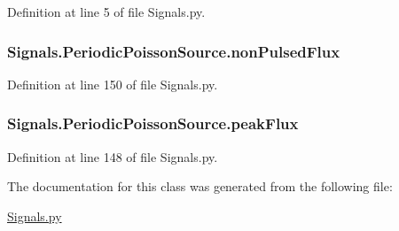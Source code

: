 Definition at line 5 of file Signals.\+py.

\subsubsection[{\texorpdfstring{non\+Pulsed\+Flux}{nonPulsedFlux}}]{\setlength{\rightskip}{0pt plus 5cm}Signals.\+Periodic\+Poisson\+Source.\+non\+Pulsed\+Flux}\hypertarget{classSignals_1_1PeriodicPoissonSource_ae7263c966fad19095391c6059cfde470}{}\label{classSignals_1_1PeriodicPoissonSource_ae7263c966fad19095391c6059cfde470}


Definition at line 150 of file Signals.\+py.

\subsubsection[{\texorpdfstring{peak\+Flux}{peakFlux}}]{\setlength{\rightskip}{0pt plus 5cm}Signals.\+Periodic\+Poisson\+Source.\+peak\+Flux}\hypertarget{classSignals_1_1PeriodicPoissonSource_a82a19a1b9b3e05977befcd1044f7fd1f}{}\label{classSignals_1_1PeriodicPoissonSource_a82a19a1b9b3e05977befcd1044f7fd1f}


Definition at line 148 of file Signals.\+py.



The documentation for this class was generated from the following file\+:\begin{DoxyCompactItemize}
\item 
\hyperlink{Signals_8py}{Signals.\+py}\end{DoxyCompactItemize}
